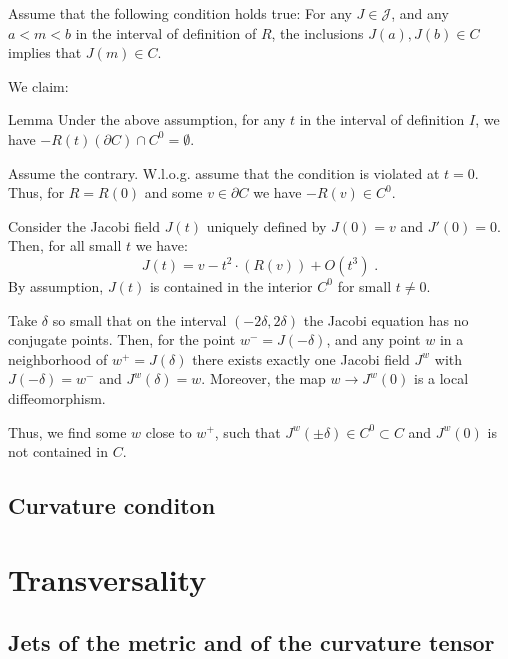 \documentclass[a4paper,10pt]{article}
\begin{document}
Assume that the following condition holds true:  For any $J\in \mathcal J$, and any $a<m<b$ in the interval of definition of $R$, the inclusions $J(a),J(b) \in C$ implies that $J(m)\in C$.

We claim:
\begin{thm}{Lemma}
	Under the above assumption, for any $t$ in the interval of definition $I$, we have 
	$-R(t) (\partial C)  \cap C^0 =\emptyset$. 
\end{thm}

	Assume the contrary. W.l.o.g. assume that the condition is violated at $t=0$.
	Thus, for $R=R(0)$ and some $v\in \partial C$ we have $-R(v)\in C^0$.
	
	Consider the Jacobi field $J(t)$ uniquely defined by 
	$J(0)=v$ and $J'(0)=0$.  
	Then, for all small $t$ we have:
	$$J(t)= v  -  t ^2 \cdot  (R (v)) + O(t^3)\;.$$
	By assumption,  $J(t)$ is contained in the interior $C^0$ for small $t \neq 0$.
	
	Take $\delta$ so small that on the interval $(-2\delta, 2\delta)$ the Jacobi equation has no conjugate points.
	Then, for the point $w^-= J(-\delta)$, and any point  $w$ in a neighborhood of $w^+ =J(\delta)$ there exists exactly one Jacobi field $J^w$
		with $J(-\delta)=w^-$ and $J^w(\delta )= w$.  Moreover, the map $w\to J^w(0)$ is a local diffeomorphism.
		
		Thus, we find some $w$ close to $w^+$, such that $J^w (\pm \delta) \in C^0 \subset C$ and $J^w(0)$ is not contained in $C$. 
\qeds


\subsection{Curvature conditon}



\section{Transversality}
\subsection{Jets of the metric and of the curvature tensor}














\end{document}
